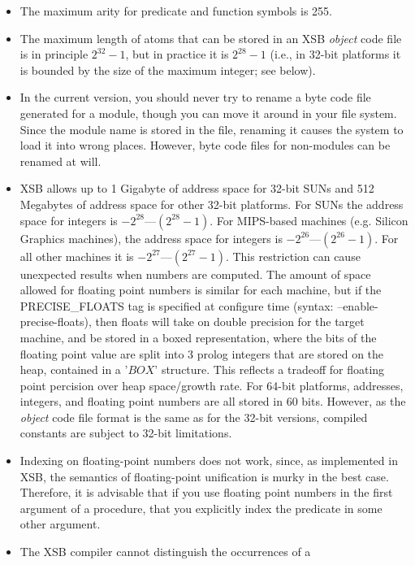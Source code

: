 \begin{itemize}
\item The maximum arity for predicate and function symbols is 255.
%
\item The maximum length of atoms that can be stored in an XSB
      \emph{object} code file is in principle $2^{32}-1$, but in
      practice it is $2^{28}-1$ (i.e., in 32-bit platforms it is
      bounded by the size of the maximum integer; see below).
%
\item In the current version, you should never try to rename a byte code 
      file generated for a module, though you can move it around in your 
      file system.  Since the module name is stored in the file, renaming it
      causes the system to load it into wrong places.  However, byte code 
      files for non-modules can be renamed at will.
%
\item XSB allows up to 1 Gigabyte of address space for 32-bit SUNs and 512
      Megabytes of address space for other 32-bit platforms.  For SUNs the
      address space for integers is $-2^{28}$---$(2^{28}-1)$.  For
      MIPS-based machines (e.g. Silicon Graphics machines), the
      address space for integers is $-2^{26}$---$(2^{26}-1)$.  For all
      other machines it is $-2^{27}$---$(2^{27}-1)$.  This restriction can
      cause unexpected results when numbers are computed.  The amount
      of space allowed for floating point numbers is similar for each
      machine, but if the PRECISE_FLOATS tag is specified at configure time
      (syntax: --enable-precise-floats), then floats will take on double precision
      for the target machine, and be stored in a boxed representation, where the 
      bits of the floating point value are split into 3 prolog integers that are
      stored on the heap, contained in a '$BOX$' structure. This reflects a tradeoff
      for floating point percision over heap space/growth rate.
      For 64-bit platforms, addresses, integers, and floating point numbers are 
      all stored in 60 bits. However, as the \emph{object} code file format is 
      the same as for the 32-bit versions, compiled constants are subject to 
      32-bit limitations.
%
\item	Indexing on floating-point numbers does not work, since, as
implemented in XSB, the semantics
      of floating-point unification is murky in the best case. Therefore, it
      is advisable that if you use floating point numbers in the first 
      argument of a procedure,  that you explicitly index the
      predicate in some other argument.
%
\item	The XSB compiler cannot distinguish the occurrences of a

\end{itemize}
